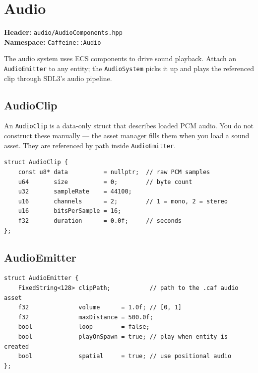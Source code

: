 \chapter{Audio}

\textbf{Header:} \texttt{audio/AudioComponents.hpp}\\
\textbf{Namespace:} \texttt{Caffeine::Audio}

The audio system uses ECS components to drive sound playback. Attach an
\texttt{AudioEmitter} to any entity; the \texttt{AudioSystem} picks it up
and plays the referenced clip through SDL3's audio pipeline.

\section{AudioClip}

An \texttt{AudioClip} is a data-only struct that describes loaded PCM audio.
You do not construct these manually — the asset manager fills them when you
load a sound asset. They are referenced by path inside \texttt{AudioEmitter}.

\begin{lstlisting}
struct AudioClip {
    const u8* data          = nullptr;  // raw PCM samples
    u64       size          = 0;        // byte count
    u32       sampleRate    = 44100;
    u16       channels      = 2;        // 1 = mono, 2 = stereo
    u16       bitsPerSample = 16;
    f32       duration      = 0.0f;     // seconds
};
\end{lstlisting}

\section{AudioEmitter}

\begin{lstlisting}
struct AudioEmitter {
    FixedString<128> clipPath;           // path to the .caf audio asset
    f32              volume      = 1.0f; // [0, 1]
    f32              maxDistance = 500.0f;
    bool             loop        = false;
    bool             playOnSpawn = true; // play when entity is created
    bool             spatial     = true; // use positional audio
};
\end{lstlisting}

